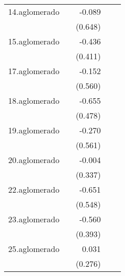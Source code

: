 {\begin{longtable}{l*{4}{D{.}{.}{-1}}}
\addlinespace
14.aglomerado&                     &      -0.089         &                     &                     \\
            &                     &     (0.648)         &                     &                     \\
\addlinespace
15.aglomerado&                     &      -0.436         &                     &                     \\
            &                     &     (0.411)         &                     &                     \\
\addlinespace
17.aglomerado&                     &      -0.152         &                     &                     \\
            &                     &     (0.560)         &                     &                     \\
\addlinespace
18.aglomerado&                     &      -0.655         &                     &                     \\
            &                     &     (0.478)         &                     &                     \\
\addlinespace
19.aglomerado&                     &      -0.270         &                     &                     \\
            &                     &     (0.561)         &                     &                     \\
\addlinespace
20.aglomerado&                     &      -0.004         &                     &                     \\
            &                     &     (0.337)         &                     &                     \\
\addlinespace
22.aglomerado&                     &      -0.651         &                     &                     \\
            &                     &     (0.548)         &                     &                     \\
\addlinespace
23.aglomerado&                     &      -0.560         &                     &                     \\
            &                     &     (0.393)         &                     &                     \\
\addlinespace
25.aglomerado&                     &       0.031         &                     &                     \\
            &                     &     (0.276)         &                     &                     \\

\end{longtable}}
